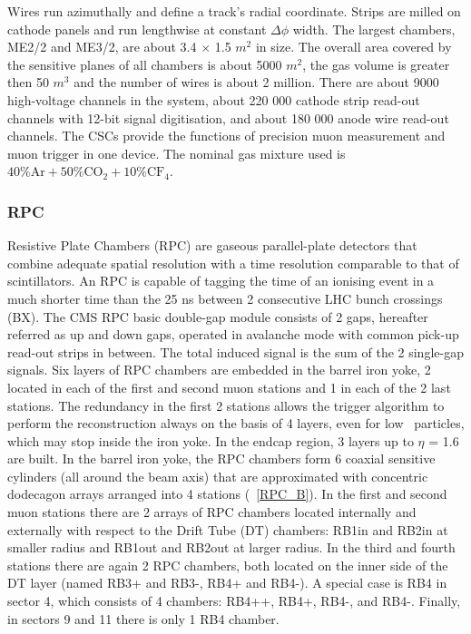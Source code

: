 Wires run azimuthally and define a track's radial coordinate. Strips are milled on cathode panels and run lengthwise at constant $\Delta \phi$ width. The largest chambers, ME2/2 and ME3/2, are about 3.4 $\times$ 1.5 $m^{2}$ in size. The overall area covered by the sensitive planes of all chambers is about 5000 $m^{2}$, the gas volume is greater then 50 $m^{3}$ and the number of wires is about 2 million. There are about 9000 high-voltage channels in the system, about 220 000 cathode strip read-out channels with 12-bit signal digitisation, and about 180 000 anode wire read-out channels. The CSCs provide the functions of precision muon measurement and muon trigger in one device. The nominal gas mixture used is 
$\mathrm{40\%Ar + 50\%CO_{2} + 10\%CF_{4}.}$

\subsubsection{RPC}
Resistive Plate Chambers (RPC) are gaseous parallel-plate detectors that combine adequate spatial resolution with a time resolution comparable to that of scintillators. An RPC is capable of tagging the time of an ionising event in a much shorter time than the 25 ns between 2 consecutive LHC bunch crossings (BX). The CMS RPC basic double-gap module consists of 2 gaps, hereafter referred as up and down gaps, operated in avalanche mode with common pick-up read-out strips in between. The total induced signal is the sum of the 2 single-gap signals.  Six layers of RPC chambers are embedded in the barrel iron yoke, 2 located in each of the first and second muon stations and 1 in each of the 2 last stations. The redundancy in the first 2 stations allows the trigger algorithm to perform the reconstruction always on the basis of 4 layers, even for low \pt\ particles, which may stop inside the iron yoke. In the endcap region, 3 layers up to $\eta$ = 1.6 are built. In the barrel iron yoke, the RPC chambers form 6 coaxial sensitive cylinders (all around the beam axis) that are approximated with concentric dodecagon arrays arranged into 4 stations (\figurename~\ref{RPC_B}). In the first and second muon stations there are 2 arrays of RPC chambers located internally and externally with respect to the Drift Tube (DT) chambers: RB1in and RB2in at smaller radius and RB1out and RB2out at larger radius. In the third and fourth stations there are again 2 RPC chambers, both located on the inner side of the DT layer (named RB3+ and RB3-, RB4+ and RB4-). A special case is RB4 in sector 4, which consists of 4 chambers: RB4++, RB4+, RB4-, and RB4-. Finally, in sectors 9 and 11 there is only 1 RB4 chamber.

